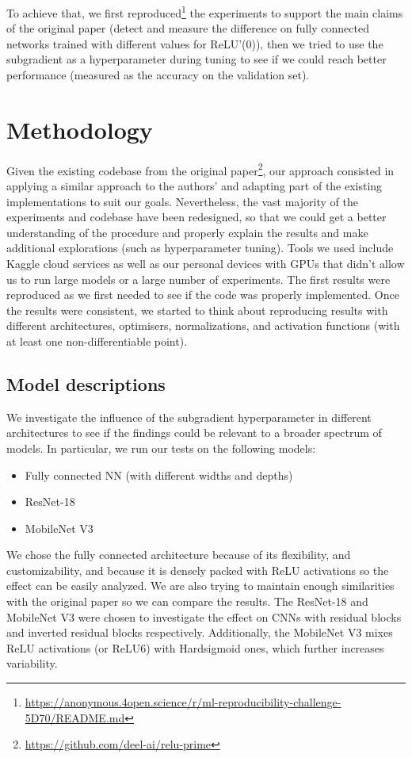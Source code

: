 To achieve that, we first reproduced\footnote{\url{https://anonymous.4open.science/r/ml-reproducibility-challenge-5D70/README.md}} the experiments to support the main claims of the original paper (detect and measure the difference on fully connected networks trained with different values for ReLU'(0)), then we tried to use the subgradient as a hyperparameter during tuning to see if we could reach better performance (measured as the accuracy on the validation set).

\section{Methodology}
Given the existing codebase from the original paper\footnote{\url{https://github.com/deel-ai/relu-prime}}, our approach consisted in applying a similar approach to the authors' and adapting part of the existing implementations to suit our goals. Nevertheless, the vast majority of the experiments and codebase have been redesigned, so that we could get a better understanding of the procedure and properly explain the results and make additional explorations (such as hyperparameter tuning). Tools we used include Kaggle cloud services as well as our personal devices with GPUs that didn't allow us to run large models or a large number of experiments. The first results were reproduced as we first needed to see if the code was properly implemented. Once the results were consistent, we started to think about reproducing results with different architectures, optimisers, normalizations, and activation functions (with at least one non-differentiable point).

\subsection{Model descriptions}
We investigate the influence of the subgradient hyperparameter in different architectures to see if the findings could be relevant to a broader spectrum of models. In particular, we run our tests on the following models:

\begin{itemize}
\item Fully connected NN (with different widths and depths)
\item ResNet-18
\item MobileNet V3
\end{itemize}

We chose the fully connected architecture because of its flexibility, and customizability, and because it is densely packed with ReLU activations so the effect can be easily analyzed. We are also trying to maintain enough similarities with the original paper so we can compare the results. The ResNet-18 and MobileNet V3 were chosen to investigate the effect on CNNs with residual blocks and inverted residual blocks respectively. Additionally, the MobileNet V3 mixes ReLU activations (or ReLU6) with Hardsigmoid ones, which further increases variability.

